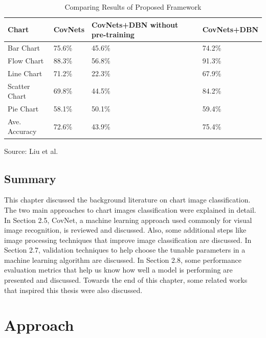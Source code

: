 \documentclass[12pt, a4paper,oneside]{report}
\newcommand{\source}[1]{\vspace{-3pt} \caption*{ Source: {#1}} }
\begin{document}
\begin{table}[h]
	\centering {} \small
	\begin{tabular}{|p{3cm}|p{3cm}|p{3cm}|p{3cm}|}
		
		\hline
		Chart & CovNets&CovNets+DBN without pre-training & CovNets+DBN \\ \hline
				
		Bar Chart & 75.6\% & 45.6\% & 74.2\% \\ \hline
		Flow Chart & 88.3\%  & 56.8\% & 91.3\%  \\ \hline
		Line Chart  & 71.2\%  & 22.3\% & 67.9\% \\ \hline
	
		Scatter Chart & 69.8\% & 44.5\% & 84.2\% \\ \hline
		Pie Chart & 58.1\%  & 50.1\% & 59.4\%    \\ \hline
		Ave. Accuracy & 72.6\%  & 43.9\% & 75.4\% \\ \hline
		
	\end{tabular}
	\caption {Comparing Results of Proposed Framework }	
	\label{table:deep}
	\source{Liu et al.~\cite{liu2015chart}}
\end{table}


\section{Summary}
This chapter discussed the background literature on chart image classification. The two main approaches to chart images classification were explained in detail. In Section 2.5, CovNet, a machine learning approach used commonly for visual image recognition, is reviewed and discussed. Also, some additional steps like image processing techniques that improve image classification are discussed.  In Section 2.7, validation techniques to help choose the tunable parameters in a machine learning algorithm are discussed. In Section 2.8, some performance evaluation metrics that help us know how well a model is performing are presented and discussed. Towards the end of this chapter, some related works that inspired this thesis were also discussed.


\chapter{Approach}
\end{document}
